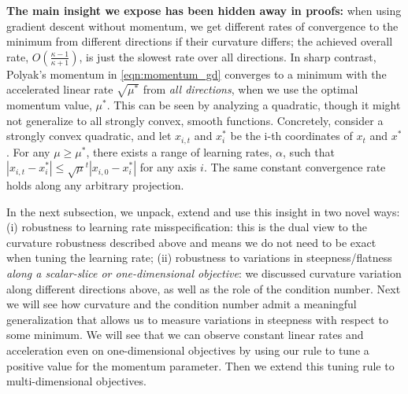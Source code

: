 \documentclass{article} %
\newcommand{\yell}[1]{#1}
\begin{document}
{\bf The main insight we expose has been hidden away in proofs:}
when using gradient descent without momentum, 
we get different rates of convergence to the minimum from different directions if their curvature differs; the achieved overall rate, $O(\frac{\kappa-1}{\kappa+1})$, is just the slowest rate over all directions. 
In sharp contrast, Polyak's momentum in \eqref{eqn:momentum_gd} converges to a minimum with the accelerated linear rate $\sqrt{\mu^*}$ from {\em all directions},
when we use the optimal momentum value, $\mu^*$.
This can be seen by analyzing a quadratic, though it might not generalize to all strongly convex, smooth functions.
Concretely, consider a strongly convex quadratic, and let $x_{i, t}$ and $x_i^*$ be the i-th coordinates of $x_t$ and $x^*$.
%
For any $\mu \geq \mu^*$, there exists a range of learning rates, $\alpha$, such that $| x_{i, t} - x_i^* | \leq \sqrt{\mu}^t | x_{i,0} - x_i^* |$ for any axis $i$.
The same constant convergence rate holds along any arbitrary projection.

In the next subsection, we unpack, extend and use this insight in two novel ways:
(i) robustness to learning rate misspecification: 
this is the dual view to the curvature robustness described above and means we do not need to be exact when tuning the learning rate;
(ii) robustness to variations in steepness/flatness {\em along a scalar-slice or one-dimensional objective}:
we discussed curvature variation along different directions above, as well as the role of the condition number.
Next we will see how curvature and the condition number admit a meaningful generalization that allows us to measure variations in steepness with respect to some minimum.
We will see that we can observe constant linear rates and acceleration even on one-dimensional objectives by using our rule to tune a positive value for the momentum parameter.
Then we extend this tuning rule to multi-dimensional objectives.
\end{document}
